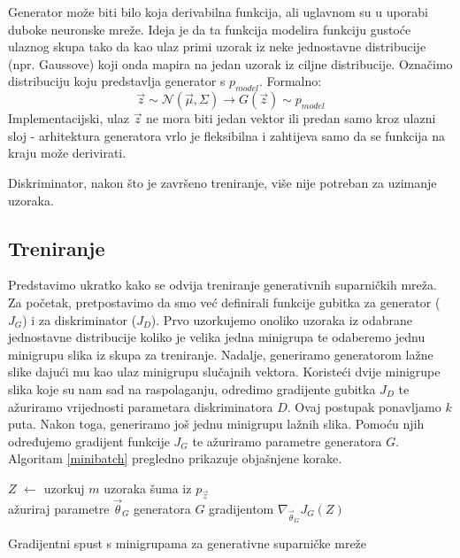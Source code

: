 Generator može biti bilo koja derivabilna funkcija, ali uglavnom su u uporabi duboke neuronske mreže. Ideja je da ta funkcija modelira funkciju gustoće ulaznog skupa tako da kao ulaz primi uzorak iz neke jednostavne distribucije (npr. Gaussove) koji onda mapira na jedan uzorak iz ciljne distribucije. Označimo distribuciju koju predstavlja generator s $p_{model}$. Formalno:
\begin{equation*}
	\vec{z} \sim \mathcal{N}(\vec{\mu}, \Sigma) \rightarrow G(\vec{z}) \sim p_{model}
\end{equation*}
Implementacijski, ulaz $\vec{z}$ ne mora biti jedan vektor ili predan samo kroz ulazni sloj - arhitektura generatora vrlo je fleksibilna i zahtijeva samo da se funkcija na kraju može derivirati.

Diskriminator, nakon što je završeno treniranje, više nije potreban za uzimanje uzoraka.

\subsection{Treniranje}
Predstavimo ukratko kako se odvija treniranje generativnih suparničkih mreža. Za početak, pretpostavimo da smo već definirali funkcije gubitka za generator ($J_G$) i za diskriminator ($J_D$). Prvo uzorkujemo onoliko uzoraka iz odabrane jednostavne distribucije koliko je velika jedna minigrupa te odaberemo jednu minigrupu slika iz skupa za treniranje. Nadalje, generiramo generatorom lažne slike dajući mu kao ulaz minigrupu slučajnih vektora. Koristeći dvije minigrupe slika koje su nam sad na raspolaganju, odredimo gradijente gubitka $J_D$ te ažuriramo vrijednosti parametara diskriminatora $D$. Ovaj postupak ponavljamo $k$ puta. Nakon toga, generiramo još jednu minigrupu lažnih slika. Pomoću njih određujemo gradijent funkcije $J_G$ te ažuriramo parametre generatora $G$. Algoritam \ref{minibatch} pregledno prikazuje objašnjene korake. \\

\begin{algorithm}[H]
\label{minibatch}
\SetAlgoLined
{}
$Z$ $\leftarrow$ uzorkuj $m$ uzoraka šuma iz $p_{\vec{z}}$ \\
ažuriraj parametre $\vec{\theta}_G$ generatora $G$ gradijentom $\nabla_{\vec{\theta}_G} J_G (Z)$
\caption{Gradijentni spust s minigrupama za generativne suparničke mreže}
\end{algorithm}

